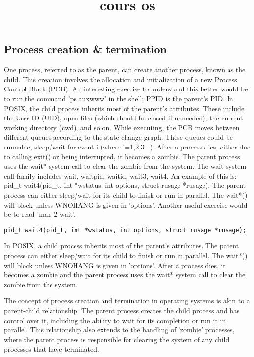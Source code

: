 \documentclass[12pt]{article}
\title{cours os }
\author{}
\begin{document}
\maketitle
\tableofcontents
\newpage
\subsection*{Process creation \& termination} One process, referred to as the parent, can create another process, known as the child. This creation involves the allocation and initialization of a new Process Control Block (PCB). An interesting exercise to understand this better would be to run the command 'ps auxwww' in the shell; PPID is the parent's PID. In POSIX, the child process inherits most of the parent's attributes. These include the User ID (UID), open files (which should be closed if unneeded), the current working directory (cwd), and so on. While executing, the PCB moves between different queues according to the state change graph. These queues could be runnable, sleep/wait for event i (where i=1,2,3...). After a process dies, either due to calling exit() or being interrupted, it becomes a zombie. The parent process uses the wait* system call to clear the zombie from the system. The wait system call family includes wait, waitpid, waitid, wait3, wait4. An example of this is: pid_t wait4(pid_t, int *wstatus, int options, struct rusage *rusage). The parent process can either sleep/wait for its child to finish or run in parallel. The wait*() will block unless WNOHANG is given in 'options'. Another useful exercise would be to read 'man 2 wait'.
\begin{lstlisting}
pid_t wait4(pid_t, int *wstatus, int options, struct rusage *rusage);
\end{lstlisting}
\begin{tcolorbox}[colback=yellow!5, colframe=yellow!80!black, title={\faBookmark À retenir}] In POSIX, a child process inherits most of the parent's attributes. The parent process can either sleep/wait for its child to finish or run in parallel. The wait*() will block unless WNOHANG is given in 'options'. After a process dies, it becomes a zombie and the parent process uses the wait* system call to clear the zombie from the system. \end{tcolorbox}
\begin{tcolorbox}[colback=green!5, colframe=green!75!black, title={\faLightbulb Intuition}] The concept of process creation and termination in operating systems is akin to a parent-child relationship. The parent process creates the child process and has control over it, including the ability to wait for its completion or run it in parallel. This relationship also extends to the handling of 'zombie' processes, where the parent process is responsible for clearing the system of any child processes that have terminated. \end{tcolorbox}
\end{document}
